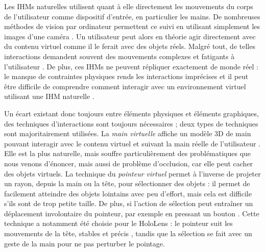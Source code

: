 
Les IHMs naturelles utilisent quant à elle directement les mouvements du corps de l'utilisateur comme dispositif d'entrée, en particulier les mains. De nombreuses méthodes de vision par ordinateur permettent ce suivi en utilisant simplement les images d'une caméra \citep{Billinghurst2015}. Un utilisateur peut alors en théorie agir directement avec du contenu virtuel comme il le ferait avec des objets réels. Malgré tout, de telles interactions demandent souvent des mouvements complexes et fatigants à l'utilisateur \citep{Bowman2001}. De plus, ces IHMs ne peuvent répliquer exactement de monde réel : le manque de contraintes physiques rends les interactions imprécises \citep{Chan2010} et il peut être difficile de comprendre comment interagir avec un environnement virtuel utilisant une IHM naturelle \citep{Argelaguet2013}.


Un écart existant donc toujours entre éléments physiques et éléments graphiques, des techniques d'interactions sont toujours nécessaires ; deux types de techniques sont majoritairement utilisées. La \emph{main virtuelle} affiche un modèle 3D de main pouvant interagir avec le contenu virtuel et suivant la main réelle de l'utilisateur . Elle est la plus naturelle, mais souffre particulièrement des problématiques que nous venons d'énoncer, mais aussi de problème d'occlusion, car elle peut cacher des objets virtuels. La technique du \emph{pointeur virtuel} permet à l'inverse de projeter un rayon, depuis la main ou la tête, pour sélectionner des objets  : il permet de facilement atteindre des objets lointains avec peu d'effort, mais cela est difficile s'ils sont de trop petite taille. De plus, si l'action de sélection peut entraîner un déplacement involontaire du pointeur, par exemple en pressant un bouton \citep{Argelaguet2013}. Cette technique a notamment été choisie pour le HoloLens : le pointeur suit les mouvements de la tête, stables et précis \citep{Kitoe2018}, tandis que la sélection se fait avec un geste de la main pour ne pas perturber le pointage.

